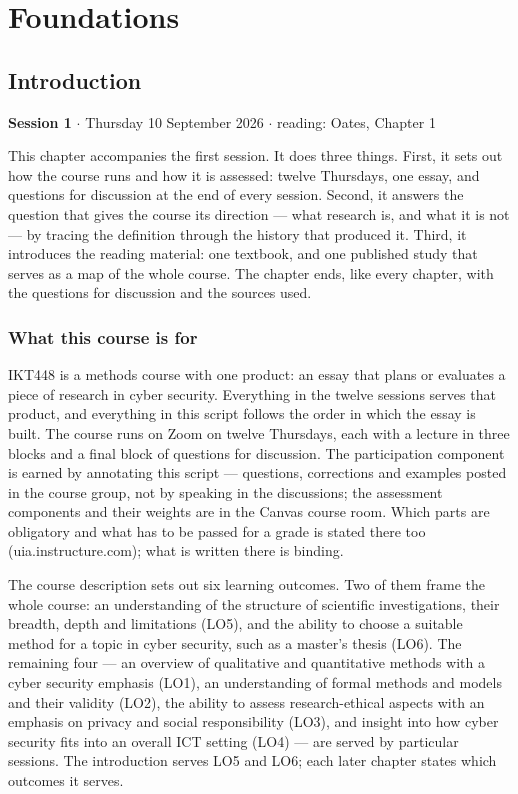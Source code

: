 \documentclass[11pt,a4paper,british,twoside=false,headings=small,chapterprefix=false,numbers=noenddot]{scrbook}
\newcommand{\sessionhead}[2]{\begin{tcolorbox}[enhanced, colback=uiamutedblue, colframe=uiamutedblue, arc=1.5pt, left=6pt, right=6pt]
  \small \textbf{Session #1} \;$\cdot$\; #2\end{tcolorbox}}
\begin{document}
\mainmatter

\part{Foundations}
\chapter{Introduction}
\label{ch:1}
\sessionhead{1}{Thursday 10 September 2026 \;$\cdot$\; reading: Oates, Chapter 1}

This chapter accompanies the first session. It does three things. First, it sets out how the course runs and how it is assessed: twelve Thursdays, one essay, and questions for discussion at the end of every session. Second, it answers the question that gives the course its direction --- what research is, and what it is not --- by tracing the definition through the history that produced it. Third, it introduces the reading material: one textbook, and one published study that serves as a map of the whole course. The chapter ends, like every chapter, with the questions for discussion and the sources used.


\section{What this course is for}

IKT448 is a methods course with one product: an essay that plans or evaluates a piece of research in cyber security. Everything in the twelve sessions serves that product, and everything in this script follows the order in which the essay is built. The course runs on Zoom on twelve Thursdays, each with a lecture in three blocks and a final block of questions for discussion. The participation component is earned by annotating this script --- questions, corrections and examples posted in the course group, not by speaking in the discussions; the assessment components and their weights are in the Canvas course room. Which parts are obligatory and what has to be passed for a grade is stated there too (uia.instructure.com); what is written there is binding.

The course description sets out six learning outcomes. Two of them frame the whole course: an understanding of the structure of scientific investigations, their breadth, depth and limitations (LO5), and the ability to choose a suitable method for a topic in cyber security, such as a master's thesis (LO6). The remaining four --- an overview of qualitative and quantitative methods with a cyber security emphasis (LO1), an understanding of formal methods and models and their validity (LO2), the ability to assess research-ethical aspects with an emphasis on privacy and social responsibility (LO3), and insight into how cyber security fits into an overall ICT setting (LO4) --- are served by particular sessions. The introduction serves LO5 and LO6; each later chapter states which outcomes it serves.
\end{document}
